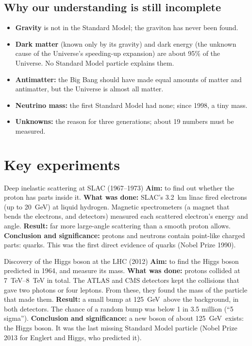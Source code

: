 \subsection{Why our understanding is still incomplete}

\begin{itemize}
  \item \textbf{Gravity} is not in the Standard Model; the graviton has never been found.
  \item \textbf{Dark matter} (known only by its gravity) and dark energy (the unknown cause
        of the Universe's speeding-up expansion) are about 95\% of the Universe. No Standard Model particle explains them.
  \item \textbf{Antimatter:} the Big Bang should have made equal amounts of matter and
        antimatter, but the Universe is almost all matter.
  \item \textbf{Neutrino mass:} the first Standard Model had none; since 1998, a tiny mass.
  \item \textbf{Unknowns:} the reason for three generations; about 19 numbers must be measured.
\end{itemize}

\section{Key experiments}\label{ch5:sec:experiments}

\begin{experiment}{Deep inelastic scattering at SLAC (1967--1973)}
\textbf{Aim:} to find out whether the proton has parts inside it. \textbf{What was done:}
SLAC's \qty{3.2}{km} linac fired electrons (up to \qty{20}{GeV}) at liquid hydrogen. Magnetic
spectrometers (a magnet that bends the electrons, and detectors) measured each scattered
electron's energy and angle. \textbf{Result:} far more large-angle scattering than a smooth
proton allows. \textbf{Conclusion and significance:} protons and neutrons contain point-like
charged parts: quarks. This was the first direct evidence of quarks (Nobel Prize 1990).
\end{experiment}

\begin{experiment}{Discovery of the Higgs boson at the LHC (2012)}
\textbf{Aim:} to find the Higgs boson predicted in 1964, and measure its mass.
\textbf{What was done:} protons collided at \qtyrange{7}{8}{TeV} in total. The ATLAS and CMS
detectors kept the collisions that gave two photons or four leptons. From these, they found
the mass of the particle that made them. \textbf{Result:} a small bump at
\qty{125}{GeV}\chFiveperc\ above the background, in both detectors. The chance of a random bump
was below 1 in 3.5 million (``5 sigma''). \textbf{Conclusion and significance:} a new boson of
about \qty{125}{GeV}\chFiveperc\ exists: the Higgs boson. It was the last missing Standard Model
particle (Nobel Prize 2013 for Englert and Higgs, who predicted it).
\end{experiment}

